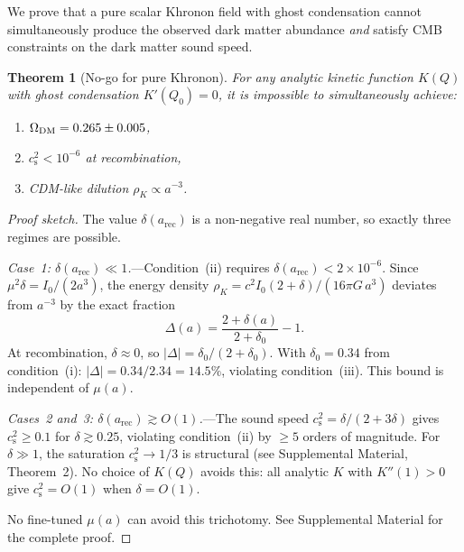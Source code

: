 \documentclass[prd,twocolumn,superscriptaddress,longbibliography,floatfix]{revtex4-2}
\newtheorem{theorem}{Theorem}
\newcommand{\cs}{c_{\mathrm{s}}}
\begin{document}
We prove that a pure scalar Khronon field with ghost condensation
cannot simultaneously produce the observed dark matter abundance
\emph{and} satisfy CMB constraints on the dark matter sound speed.

\begin{theorem}[No-go for pure Khronon]
\label{thm:nogo}
For any analytic kinetic function $K(Q)$ with ghost condensation
$K'(Q_0) = 0$, it is impossible to simultaneously achieve:
\begin{enumerate}
\item[(i)] $\Omega_{\rm DM} = 0.265 \pm 0.005$,
\item[(ii)] $\cs^2 < 10^{-6}$ at recombination,
\item[(iii)] CDM-like dilution $\rho_K \propto a^{-3}$.
\end{enumerate}
\end{theorem}

\begin{proof}[Proof sketch]
The value $\delta(a_{\mathrm{rec}})$ is a non-negative real number,
so exactly three regimes are possible.

\emph{Case~1: $\delta(a_{\mathrm{rec}}) \ll 1$.}---Condition~(ii)
requires $\delta(a_{\mathrm{rec}}) < 2\times10^{-6}$.
Since $\mu^2\delta = I_0/(2a^3)$, the energy density
$\rho_K = c^2 I_0(2{+}\delta)/(16\pi G\,a^3)$
deviates from $a^{-3}$ by the exact fraction
\begin{equation}
\Delta(a) = \frac{2+\delta(a)}{2+\delta_0} - 1.
\label{eq:Delta_sketch}
\end{equation}
At recombination, $\delta \approx 0$, so
$|\Delta| = \delta_0/(2{+}\delta_0)$.
With $\delta_0 = 0.34$ from condition~(i):
$|\Delta| = 0.34/2.34 = 14.5\%$, violating condition~(iii).
This bound is independent of $\mu(a)$.

\emph{Cases~2 and~3: $\delta(a_{\mathrm{rec}}) \gtrsim O(1)$.}---The
sound speed $\cs^2 = \delta/(2{+}3\delta)$
gives $\cs^2 \geq 0.1$ for $\delta \gtrsim 0.25$, violating
condition~(ii) by $\geq 5$ orders of magnitude.  For
$\delta \gg 1$, the saturation $\cs^2 \to 1/3$ is structural
(see Supplemental Material, Theorem~2).
No choice of $K(Q)$ avoids this: all analytic $K$ with
$K''(1) > 0$ give $\cs^2 = O(1)$ when $\delta = O(1)$.

No fine-tuned $\mu(a)$ can avoid this trichotomy.
See Supplemental Material for the complete proof.
\end{proof}

\end{document}
